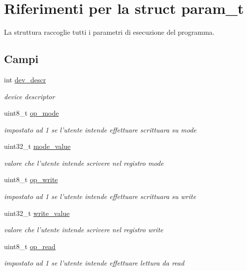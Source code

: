 \hypertarget{structparam__t}{\section{Riferimenti per la struct param\+\_\+t}
\label{structparam__t}
}


La struttura raccoglie tutti i parametri di esecuzione del programma.  


\subsection*{Campi}
\begin{DoxyCompactItemize}
\item 
int \hyperlink{structparam__t_a52701f5f8091598d5c5ac1bb80cd2070}{dev\+\_\+descr}
\begin{DoxyCompactList}\small\item\em device descriptor \end{DoxyCompactList}\item 
uint8\+\_\+t \hyperlink{structparam__t_aec948fb30e99b1eda7e3d9ff741d417a}{op\+\_\+mode}
\begin{DoxyCompactList}\small\item\em impostato ad 1 se l'utente intende effettuare scrittuara su mode \end{DoxyCompactList}\item 
uint32\+\_\+t \hyperlink{structparam__t_a007b34e09ccda08824bc74ab9d86c5a8}{mode\+\_\+value}
\begin{DoxyCompactList}\small\item\em valore che l'utente intende scrivere nel registro mode \end{DoxyCompactList}\item 
uint8\+\_\+t \hyperlink{structparam__t_a67752de733f167918a4e966354183a69}{op\+\_\+write}
\begin{DoxyCompactList}\small\item\em impostato ad 1 se l'utente intende effettuare scrittuara su write \end{DoxyCompactList}\item 
uint32\+\_\+t \hyperlink{structparam__t_a09e0cff25312ab7f748a3063c038a2d9}{write\+\_\+value}
\begin{DoxyCompactList}\small\item\em valore che l'utente intende scrivere nel registro write \end{DoxyCompactList}\item 
uint8\+\_\+t \hyperlink{structparam__t_ae66d5c3154a115636a63227b7489a6eb}{op\+\_\+read}
\begin{DoxyCompactList}\small\item\em impostato ad 1 se l'utente intende effettuare lettura da read \end{DoxyCompactList}\end{DoxyCompactItemize}


